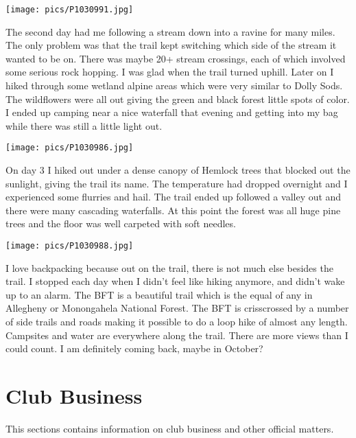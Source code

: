 \documentclass[10pt,a4paper]{article}
\newcommand\sect[1]{%
  \section*{#1}%
  \addcontentsline{toc}{section}{#1}}
\newenvironment{Figure}
  {\par\medskip\noindent\minipage{\linewidth}}
  {\endminipage\par\medskip}
\begin{document}
\begin{multicols}{2}
\begin{Figure}
 \centering
 \texttt{[image: pics/P1030991.jpg]}
\end{Figure}

The second day had me following a stream down into a ravine for many miles.  The only problem was that the trail kept switching which side of the stream it wanted to be on.  There was maybe 20+ stream crossings, each of which involved some serious rock hopping.  I was glad when the trail turned uphill.  Later on I hiked through some wetland alpine areas which were very similar to Dolly Sods.  The wildflowers were all out giving the green and black forest little spots of color. I ended up camping near a nice waterfall that evening and getting into my bag while there was still a little light out.

\begin{Figure}
 \centering
 \texttt{[image: pics/P1030986.jpg]}
\end{Figure}

On day 3 I hiked out under a dense canopy of Hemlock trees that blocked out the sunlight, giving the trail its name.  The temperature had dropped overnight and I experienced some flurries and hail. The trail ended up followed a valley out and there were many cascading waterfalls. At this point the forest was all huge pine trees and the floor was well carpeted with soft needles.

\begin{Figure}
 \centering
 \texttt{[image: pics/P1030988.jpg]}
\end{Figure}

I love backpacking because out on the trail, there is not much else besides the trail. I stopped each day when I didn’t feel like hiking anymore, and didn’t wake up to an alarm. The BFT is a beautiful trail which is the equal of any in Allegheny or Monongahela National Forest. The BFT is crisscrossed by a number of side trails and roads making it possible to do a loop hike of almost any length. Campsites and water are everywhere along the trail. There are more views than I could count. I am definitely coming back, maybe in October?

\clearpage
\pagebreak


\sect{Club Business}
This sections contains information on club business and other official matters. 


\end{multicols}
\end{document}
